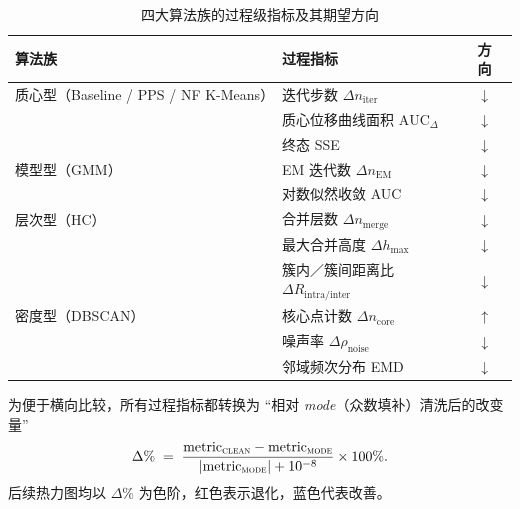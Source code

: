 \documentclass[10pt]{article} %
\numberwithin{equation}{section}
\begin{document}
\begin{enumerate}[label=\textbf{Step\,\arabic*.},itemindent=4em,leftmargin=0pt]
      \begin{table}[t]
      \centering\small
      \renewcommand{\arraystretch}{1.1}
      \setlength{\tabcolsep}{6pt}
      \begin{tabular}{@{}lll@{}}
      \toprule
      \textbf{算法族} & \textbf{过程指标} & \textbf{方向}\\
      \midrule
      质心型（Baseline / PPS / NF K-Means） 
        & 迭代步数 \(\Delta n_{\text{iter}}\)                 & \(\downarrow\)\\
        & 质心位移曲线面积 \(\text{AUC}_{\Delta}\)           & \(\downarrow\)\\
        & 终态 SSE                                           & \(\downarrow\)\\[2pt]
      模型型（GMM） 
        & EM 迭代数 \(\Delta n_{\text{EM}}\)                 & \(\downarrow\)\\
        & 对数似然收敛 AUC                                  & \(\downarrow\)\\[2pt]
      层次型（HC） 
        & 合并层数 \(\Delta n_{\text{merge}}\)               & \(\downarrow\)\\
        & 最大合并高度 \(\Delta h_{\max}\)                   & \(\downarrow\)\\
        & \small 簇内／簇间距离比 \(\Delta R_{\text{intra/inter}}\) & \(\downarrow\)\\[2pt]
      密度型（DBSCAN） 
        & 核心点计数 \(\Delta n_{\text{core}}\)              & \(\uparrow\)\\
        & 噪声率 \(\Delta\rho_{\text{noise}}\)               & \(\downarrow\)\\
        & 邻域频次分布 EMD                                   & \(\downarrow\)\\
      \bottomrule
      \end{tabular}
      \caption{四大算法族的过程级指标及其期望方向}
      \label{tab:proc_indicators}
      \end{table}

      为便于横向比较，所有过程指标都转换为
      “相对 \textit{mode}（众数填补）清洗后的改变量”
      \begin{equation}
        \label{eq:delta_pct}
        \Delta\% \;=\;
        \frac{\text{metric}_{\textsc{clean}} - \text{metric}_{\textsc{mode}}}
             {\lvert\text{metric}_{\textsc{mode}}\rvert + 10^{-8}}\times100\% .
      \end{equation}
      后续热力图均以 \(\Delta\%\) 为色阶，红色表示退化，蓝色代表改善。


\end{enumerate}
\end{document}
